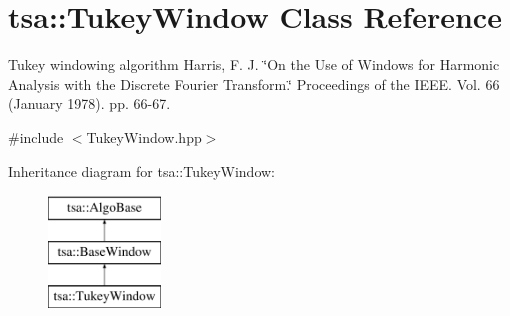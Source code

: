 \hypertarget{classtsa_1_1_tukey_window}{}\section{tsa\+:\+:Tukey\+Window Class Reference}
\label{classtsa_1_1_tukey_window}


Tukey windowing algorithm Harris, F. J. \char`\"{}\+On the Use of Windows for Harmonic Analysis with the Discrete Fourier Transform.\char`\"{} Proceedings of the I\+E\+EE. Vol. 66 (January 1978). pp. 66-\/67.  




{\ttfamily \#include $<$Tukey\+Window.\+hpp$>$}

Inheritance diagram for tsa\+:\+:Tukey\+Window\+:\begin{figure}[H]
\begin{center}
\leavevmode
\includegraphics[height=3.000000cm]{classtsa_1_1_tukey_window}
\end{center}
\end{figure}
